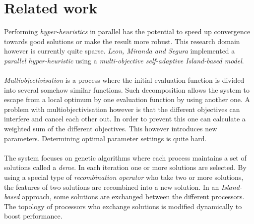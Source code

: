 \documentclass[a4paper,10pt]{article}
\newcommand{\seclab}[1]{\label{sec:#1}}
\newcommand{\secref}[1]{\ref{sec:#1}}
\theoremstyle{definition}
\begin{document}
% 

\section{Related work}
\seclab{parhyp}

Performing \emph{hyper-heuristics} in parallel has the potential to speed up convergence towards good solutions or make the result more robust. This research domain however is currently quite sparse. \emph{Leon, Miranda and Segura}\cite{} implemented a \emph{parallel hyper-heuristic} using a \emph{multi-objective self-adaptive Island-based model}.

\paragraph{}
\emph{Multiobjectivisation} is a process where the initial evaluation function is divided into several somehow similar functions. Such decomposition allows the system to escape from a local optimum by one evaluation function by using another one. A problem with multiobjectivisation however is that the different objectives can interfere and cancel each other out. In order to prevent this one can calculate a weighted sum of the different objectives. This however introduces new parameters. Determining optimal parameter settings is quite hard.

\paragraph{}
The system focuses on genetic algorithms where each process maintains a set of solutions called a \emph{deme}. In each iteration one or more solutions are selected. By using a special type of \emph{recombination operator} who take two or more solutions, the features of two solutions are recombined into a new solution. In an \emph{Island-based} approach, some solutions are exchanged between the different processors. The topology of processors who exchange solutions is modified dynamically to boost performance.
\end{document}
